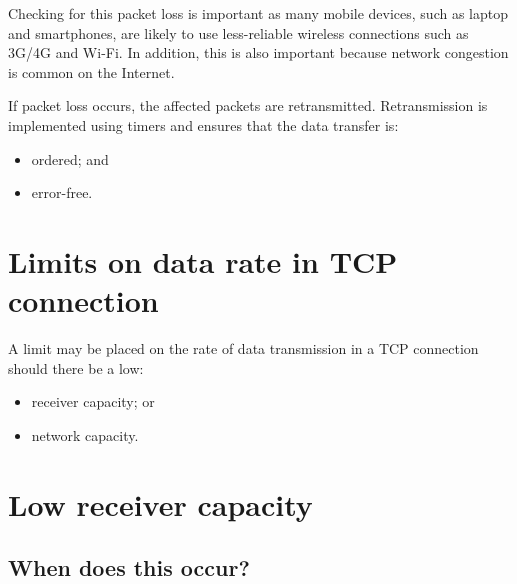 \documentclass[a4paper]{systems-software}
\begin{document}
Checking for this packet loss is important as many mobile devices, such as laptop and smartphones, are likely to use less-reliable wireless connections such as 3G/4G and Wi-Fi. In addition, this is also important because network congestion is common on the Internet.

If packet loss occurs, the affected packets are retransmitted. Retransmission is implemented using timers and ensures that the data transfer is:
\begin{itemize}
	\item ordered; and
	\item error-free.
\end{itemize}


\section{Limits on data rate in TCP connection}

A limit may be placed on the rate of data transmission in a TCP connection should there be a low:
\begin{itemize}
	\item receiver capacity; or
	\item network capacity.
\end{itemize}


\section*{Low receiver capacity}

\subsection*{When does this occur?}
\end{document}
